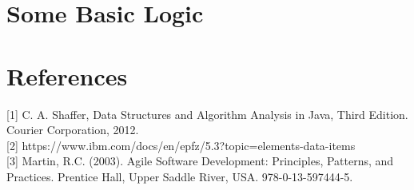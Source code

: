 \section{Some Basic Logic}

\section{References}
[1] C. A. Shaffer, Data Structures and Algorithm Analysis in Java, Third Edition. Courier Corporation, 2012.
\\

[2] https://www.ibm.com/docs/en/epfz/5.3?topic=elements-data-items
\\

[3] Martin, R.C. (2003). Agile Software Development: Principles, Patterns, and Practices. Prentice Hall, Upper Saddle River, USA. 978-0-13-597444-5.